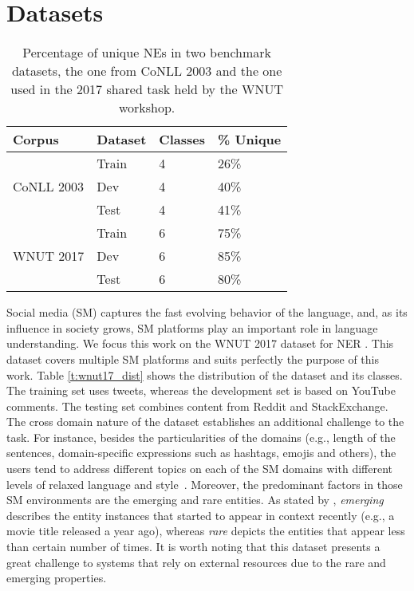\documentclass[11pt,a4paper]{article}
\begin{document}
\section{Datasets}
\label{sec:dataset}
\begin{table}
\centering
\begin{tabular}{llll}\\\hline
Corpus & Dataset & Classes & \% Unique \\\hline
\multirow{3}{*}{CoNLL 2003} & Train & 4 & 26\% \\  
 & Dev  &4 & 40\% \\  
 & Test  &4 & 41\% \\  \hline
\multirow{3}{*}{WNUT 2017} & Train & 6 & 75\% \\ 
 & Dev  & 6 & 85\% \\ 
 & Test & 6 & 80\% \\ \hline
\end{tabular}
\caption{Percentage of unique NEs in two benchmark datasets, the one from CoNLL 2003 and the one used in the 2017 shared task held by the WNUT workshop.}\label{t:stats_unique}
\end{table}

Social media (SM) captures the fast evolving behavior of the language, and, as its influence in society grows, SM platforms play an important role in language understanding. We focus this work on the WNUT 2017 dataset for NER \citep{DerczynskiEtAl:17}. This dataset covers multiple SM platforms and suits perfectly the purpose of this work. Table \ref{t:wnut17_dist} shows the distribution of the dataset and its classes. The training set uses tweets, whereas the development set is based on YouTube comments. The testing set combines content from Reddit and StackExchange. The cross domain nature of the dataset establishes an additional challenge to the task. For instance, besides the particularities of the domains (e.g., length of the sentences, domain-specific expressions such as hashtags, emojis and others), the users tend to address different topics on each of the SM domains with different levels of relaxed language and style~\citep{Ritter:2011:NER:2145432.2145595, StraussEtAl:16, DerczynskiEtAl:17}. Moreover, the predominant factors in those SM environments are the emerging and rare entities. As stated by \citet{DerczynskiEtAl:17}, \textit{emerging} describes the entity instances that started to appear in context recently (e.g., a movie title released a year ago), whereas \textit{rare} depicts the entities that appear less than certain number of times. It is worth noting that this dataset presents a great challenge to systems that rely on external resources due to the rare and emerging properties. 
\end{document}
